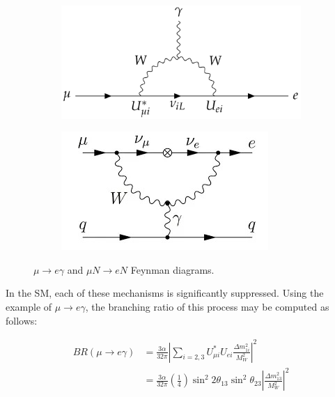 \begin{figure}[!h]
     \begin{subfigure}[b]{0.4\linewidth}
         \centering
         \includegraphics[scale = 0.2]{figures/png/Screenshot_20240217_171058.png}
         \label{fig:mutoegamma}
     \end{subfigure}
     \begin{subfigure}[b]{0.7\linewidth}
         \centering
         \includegraphics[scale = 0.5]{figures/jpg/1_erkKoywyuFzJmMv4PKpc9Q.jpg}
         \label{fig:mutoeN}
     \end{subfigure}
     \caption[$\mu \rightarrow e \gamma$ and $\mu N \rightarrow e N$ Feynman diagrams.]{$\mu \rightarrow e \gamma$ and $\mu N \rightarrow e N$ Feynman diagrams.}
        \label{fig:three graphs2}
\end{figure}
In the SM, each of these mechanisms is significantly suppressed. Using the example of $\mu \rightarrow  e \gamma $, the branching ratio of this process may be computed as follows:

\begin{equation}\label{br}
\begin{aligned}
B R(\mu \rightarrow e \gamma) & =\frac{3 \alpha}{32 \pi}\left|\sum_{i=2,3} U_{\mu i}^* U_{e i} \frac{\Delta m_{1 i}^2}{M_W^2}\right|^2 \\
& =\frac{3 \alpha}{32 \pi}\left(\frac{1}{4}\right) \sin ^2 2 \theta_{13} \sin ^2 \theta_{23}\left|\frac{\Delta m_{13}^2}{M_W^2}\right|^2
\end{aligned}
\end{equation}

